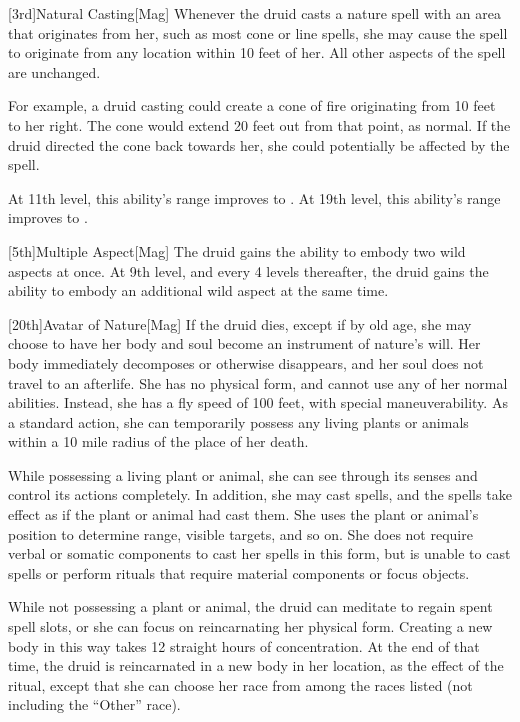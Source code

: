         [3rd]{Natural Casting}[Mag]
        Whenever the druid casts a nature spell with an area that originates from her, such as most cone or line spells, she may cause the spell to originate from any location within 10 feet of her.
        All other aspects of the spell are unchanged.

        For example, a druid casting  could create a cone of fire originating from 10 feet to her right.
        The cone would extend 20 feet out from that point, as normal.
        If the druid directed the cone back towards her, she could potentially be affected by the spell.

        At 11th level, this ability's range improves to \rngclose.
        At 19th level, this ability's range improves to \rngmed.

        [5th]{Multiple Aspect}[Mag]
        The druid gains the ability to embody two wild aspects at once.
        At 9th level, and every 4 levels thereafter, the druid gains the ability to embody an additional wild aspect at the same time.

    [20th]{Avatar of Nature}[Mag]
    If the druid dies, except if by old age, she may choose to have her body and soul become an instrument of nature's will.
    Her body immediately decomposes or otherwise disappears, and her soul does not travel to an afterlife.
    She has no physical form, and cannot use any of her normal abilities.
    Instead, she has a fly speed of 100 feet, with special maneuverability.
    As a standard action, she can temporarily possess any living plants or animals within a 10 mile radius of the place of her death.

    While possessing a living plant or animal, she can see through its senses and control its actions completely.
    In addition, she may cast spells, and the spells take effect as if the plant or animal had cast them.
    She uses the plant or animal's position to determine range, visible targets, and so on.
    She does not require verbal or somatic components to cast her spells in this form, but is unable to cast spells or perform rituals that require material components or focus objects.

    While not possessing a plant or animal, the druid can meditate to regain spent spell slots, or she can focus on reincarnating her physical form.
    Creating a new body in this way takes 12 straight hours of concentration.
    At the end of that time, the druid is reincarnated in a new body in her location, as the effect of the  ritual, except that she can choose her race from among the races listed (not including the ``Other'' race).


